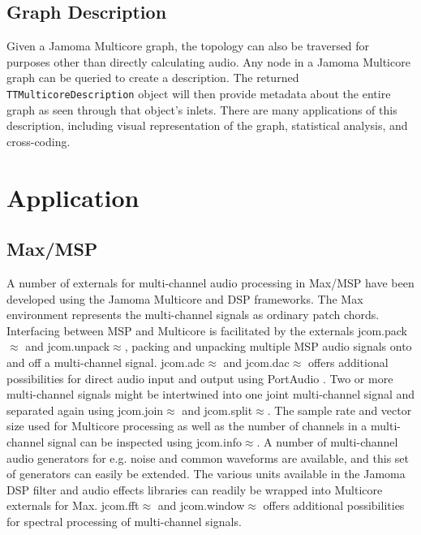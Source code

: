 \documentclass[twoside,a4paper]{article}
\begin{document}


\subsection{Graph Description} %

Given a Jamoma Multicore graph, the topology can also be traversed for purposes other than directly calculating audio.  
Any node in a Jamoma Multicore graph can be queried to create a description.  The returned \texttt{TTMulticoreDescription} object will then provide metadata about the entire graph as seen through that object's inlets.  
There are many applications of this description, including visual representation of the graph, statistical analysis, and cross-coding.







\section{Application} %

\subsection{Max/MSP} %


A number of externals for multi-channel audio processing in Max/MSP have been developed using the Jamoma Multicore and DSP frameworks. 
The Max environment represents the multi-channel signals as ordinary patch chords. 
Interfacing between MSP and Multicore is facilitated by the externals jcom.pack$\approx$ and jcom.unpack$\approx$, packing and unpacking multiple MSP audio signals onto and off a multi-channel signal. 
jcom.adc$\approx$ and jcom.dac$\approx$ offers additional possibilities for direct audio input and output using PortAudio \cite{Bencina:2003}. 
Two or more multi-channel signals might be intertwined into one joint multi-channel signal and separated again using jcom.join$\approx$ and jcom.split$\approx$.
The sample rate and vector size used for Multicore processing as well as the number of channels in a multi-channel signal can be inspected using jcom.info$\approx$.
A number of multi-channel audio generators for e.g. noise and common waveforms are available, and this set of generators can easily be extended.
The various units available in the Jamoma DSP filter and audio effects libraries can readily be wrapped into Multicore externals for Max.
jcom.fft$\approx$ and jcom.window$\approx$ offers additional possibilities for spectral processing of multi-channel signals.
\end{document}

